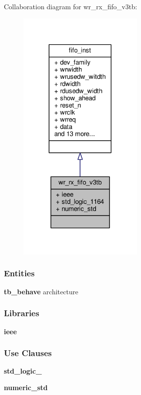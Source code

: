 Collaboration diagram for wr\+\_\+rx\+\_\+fifo\+\_\+v3tb\+:\nopagebreak
\begin{figure}[H]
\begin{center}
\leavevmode
\includegraphics[width=176pt]{d6/dff/classwr__rx__fifo__v3tb__coll__graph}
\end{center}
\end{figure}
\subsubsection*{Entities}
\begin{DoxyCompactItemize}
\item 
{\bf tb\+\_\+behave} architecture
\end{DoxyCompactItemize}
\subsubsection*{Libraries}
 \begin{DoxyCompactItemize}
\item 
{\bf ieee} 
\end{DoxyCompactItemize}
\subsubsection*{Use Clauses}
 \begin{DoxyCompactItemize}
\item 
{\bf std\+\_\+logic\+\_}   
\item 
{\bf numeric\+\_\+std}   
\end{DoxyCompactItemize}



